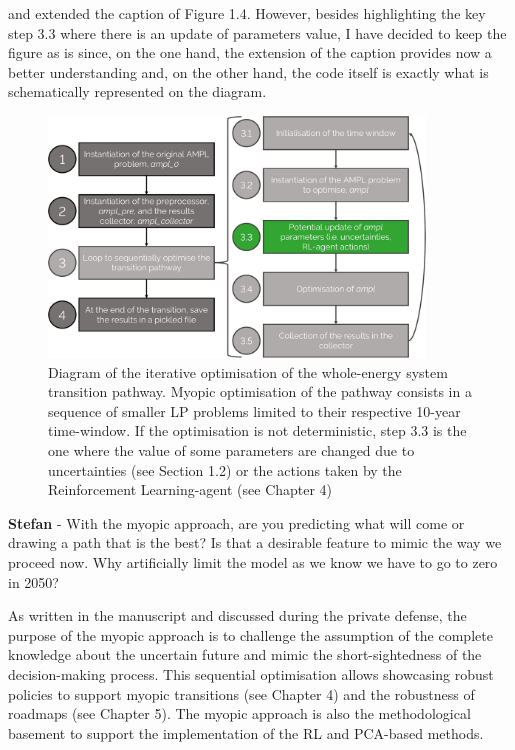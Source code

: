 \documentclass[12pt,a4paper]{article}
\begin{document}
\noindent and extended the caption of {\color{blue} Figure 1.4}. However, besides highlighting the key step 3.3 where there is an update of parameters value, I have decided to keep the figure as is since, on the one hand, the extension of the caption provides now a better understanding and, on the other hand, the code itself is exactly what is schematically represented on the diagram. 

\begin{figure}[htbp!]
\centering
\includegraphics[width=10cm]{MY_process_code.pdf}
\caption{Diagram of the iterative optimisation of the whole-energy system transition pathway. Myopic optimisation of the pathway consists in a sequence of smaller LP problems limited to their respective 10-year time-window. If the optimisation is not deterministic, step 3.3 is the one where the value of some parameters are changed due to uncertainties (see Section 1.2) or the actions taken by the Reinforcement Learning-agent (see Chapter 4)}
\label{fig:MY_process_code}
\end{figure}

\begin{mdframed}[style=comment] %
{\color{teal} \textbf{Stefan}} - With the myopic approach, are you predicting what will come or drawing a path that is the best? Is that a desirable feature to mimic the way we proceed now. Why artificially limit the model as we know we have to go to zero in 2050?
\end{mdframed}

\noindent As written in the manuscript and discussed during the private defense, the purpose of the myopic approach is to challenge the assumption of the complete knowledge about the uncertain future and mimic the short-sightedness of the decision-making process. This sequential optimisation allows showcasing robust policies to support myopic transitions (see Chapter 4) and the robustness of roadmaps (see Chapter 5). The myopic approach is also the methodological basement to support the implementation of the RL and PCA-based methods. 
\end{document}
